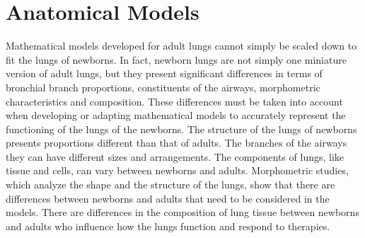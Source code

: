 \section{Anatomical Models}


Mathematical models developed for adult lungs cannot simply be scaled
down to fit the lungs of newborns. In fact, newborn lungs are not
simply one miniature version of adult lungs, but they present
significant differences in terms of bronchial branch proportions,
constituents of the airways\cite{merkus1996}, morphometric
characteristics\cite{horsfield1987} and
composition\cite{hislop1989}. These differences must be taken into
account when developing or adapting mathematical models to accurately
represent the functioning of the lungs of the newborns. The structure
of the lungs of newborns presents proportions different than that of
adults. The branches of the airways they can have different sizes and
arrangements. The components of lungs, like tissue and cells, can vary
between newborns and adults. Morphometric studies, which analyze the
shape and the structure of the lungs, show that there are differences
between newborns and adults that need to be considered in the
models. There are differences in the composition of lung tissue
between newborns and adults who influence how the lungs function and
respond to therapies.

